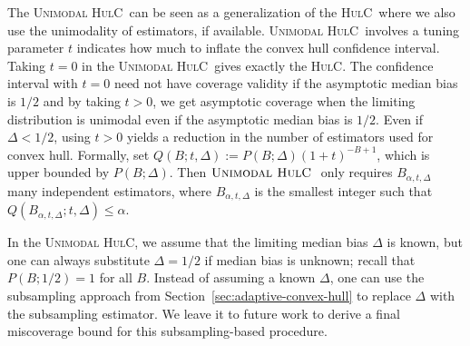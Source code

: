 \documentclass{article}
\newcommand{\hulc}{\textsc{HulC}~}
\newcommand{\hulcnospace}{\textsc{HulC}}
\newcommand{\uhulc}{\textsc{Unimodal HulC}~}
\newcommand{\uhulcnospace}{\textsc{Unimodal HulC}}
\numberwithin{myalgctr}{section}
\begin{document}
The \uhulc can be seen as a generalization of the \hulc where we also use the unimodality of estimators, if available. {\color{black}\uhulc involves a tuning parameter $t$ indicates how much to inflate the convex hull confidence interval.} Taking $t = 0$ in the \uhulc gives exactly the \hulcnospace. The confidence interval with $t = 0$ need not have coverage validity if the asymptotic median bias is $1/2$ and by taking $t > 0$, we get asymptotic coverage when the limiting distribution is unimodal even if the asymptotic median bias is $1/2$. {\color{black}Even if $\Delta < 1/2$, using $t > 0$ yields a reduction in the number of estimators used for convex hull. Formally, set $Q(B; t, \Delta) := P(B;\Delta)(1 + t)^{-B + 1}$, which is upper bounded by $P(B; \Delta)$. Then $\uhulc$ only requires $B_{\alpha,t,\Delta}$ many independent estimators, where $B_{\alpha,t,\Delta}$ is the smallest integer such that $Q(B_{\alpha,t,\Delta}; t, \Delta) \le \alpha$.} 

In the \uhulcnospace, we assume that the limiting median bias $\Delta$ is known, but one can always substitute $\Delta = 1/2$ if median bias is unknown; recall that $P(B;1/2) = 1$ for all $B$. 
Instead of assuming a known $\Delta$, one can use the subsampling approach from Section~\ref{sec:adaptive-convex-hull} to replace $\Delta$ with the subsampling estimator. We leave it to future work to derive a final miscoverage bound for this subsampling-based  procedure. 
\end{document}
